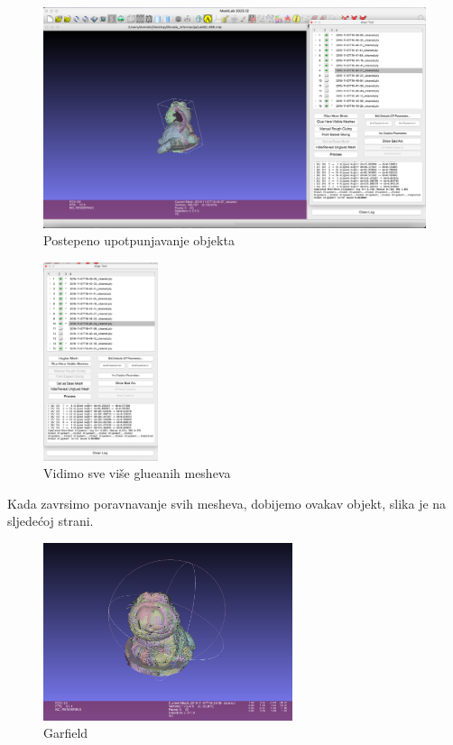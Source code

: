 \documentclass[12pt]{article} %
\begin{document}
		\begin{figure}[H]
			\centering
			\includegraphics[width=1\textwidth]{screenshots/11.png}
			\caption{Postepeno upotpunjavanje objekta}
			\label{fig:yourlabel}
		\end{figure}
		
		\begin{figure}[H]
			\centering
			\includegraphics[width=0.3\textwidth]{screenshots/12.png}
			\caption{Vidimo sve više glueanih mesheva}
			\label{fig:yourlabel}
		\end{figure}
		
		Kada zavrsimo poravnavanje svih mesheva, dobijemo ovakav objekt, slika je na sljedećoj strani.
		
		\begin{figure}[H]
			\centering
			\includegraphics[width=0.65\textwidth]{screenshots/16.png}
			\caption{Garfield}
			\label{fig:yourlabel}
		\end{figure}
		
\end{document}
